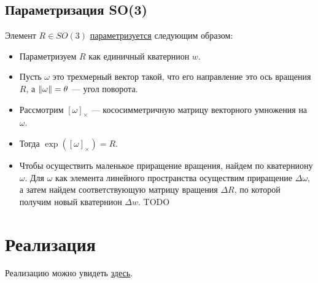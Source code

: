 \subsection{Параметризация SO(3)}
Элемент $R \in SO(3)$ \href{https://github.com/QuantumMechanicus/camera_calibration_test/blob/dev/core/utils/Local_Parametrization_SO3.h}{параметризуется}  следующим образом:
\begin{itemize}
	\item Параметризуем $R$ как единичный кватернион $w$.
	\item Пусть $\omega$ это трехмерный вектор такой, что его направление это ось вращения $R$, а $\left\lVert\omega\right\rVert = \theta$ --- угол поворота.
	\item Рассмотрим $[\omega]_{\times}$ --- кососимметричную матрицу векторного умножения на $\omega$.
	\item Тогда $\exp{([\omega]_{\times})} = R$.
	\item Чтобы осуществить маленькое приращение вращения, найдем по кватерниону $\omega$. Для $\omega$ как элемента линейного пространства осуществим приращение $\Delta\omega$, а затем найдем соответствующую матрицу вращения $\Delta R$, по которой получим новый кватернион $\Delta w$.   
	TODO 
\end{itemize}

\section{Реализация}
Реализацию можно увидеть \href{https://github.com/QuantumMechanicus/camera_calibration_test/tree/dev/subroutines/global_non_linear_optimizer}{здесь}.